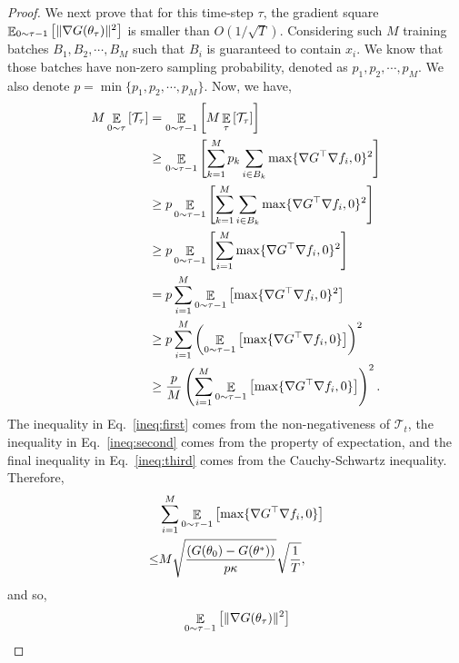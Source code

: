 \begin{proof}
We next prove that for this time-step $\tau$, the gradient square $\EEsub{\lVert \nabla G(\theta_{\tau})
\rVert^2}{0 \sim \tau-1}$ is smaller than $O(1/\sqrt{T})$. %
Considering such $M$ training batches $B_1, B_2, \cdots, B_M$ such that $B_i$ is guaranteed to contain $x_i$. We know that those batches have non-zero sampling probability, denoted as $p_1, p_2, \cdots, p_M$. We also denote $p = \min\{p_1, p_2, \cdots, p_M\}$.
Now, we have,
\begin{align}
M\EEsub{\mathcal{T}_{\tau}}{0 \sim \tau}
&= \EEsub{M\EEsub{\mathcal{T}_{\tau}}{\tau}}{0 \sim \tau-1}\\
&\geq \EEsub{\sum_{k = 1}^M p_k \sum_{i \in B_k} \max\{\nabla G^\top \nabla f_i, 0\}^2}{0 \sim \tau-1} \label{ineq:first} \\
&\geq p\EEsub{\sum_{k = 1}^M \sum_{i \in B_k} \max\{\nabla G^\top \nabla f_i, 0\}^2}{0 \sim \tau-1} \\
&\geq p\EEsub{\sum_{i=1}^M \max\{\nabla G^\top \nabla f_i, 0\}^2}{0 \sim \tau-1} \\
&= p \sum_{i=1}^M \EEsub{\max\{\nabla G^\top \nabla f_i, 0\}^2}{0 \sim \tau-1}       \\
&\geq p \sum_{i=1}^M \left (\EEsub{\max\{\nabla G^\top \nabla f_i, 0\}}{0 \sim \tau-1} \right)^2 \label{ineq:second}     \\
&\geq \frac{p}{M} \left ( \sum_{i=1}^M \EEsub{\max\{\nabla G^\top \nabla f_i, 0\}}{0 \sim \tau-1} \right)^2\label{ineq:third}.
\end{align}
The inequality in Eq.~\ref{ineq:first} comes from the non-negativeness of $\mathcal{T}_t$, the
inequality in Eq.~\ref{ineq:second} comes from the property of expectation, and the final inequality
in Eq.~\ref{ineq:third} comes from the Cauchy-Schwartz inequality. Therefore,
\begin{align}
&\sum_{i=1}^M \EEsub{\max\{\nabla G^\top \nabla f_i, 0\}}{0 \sim \tau-1} \\
\leq& M\sqrt{\frac{(G(\theta_0) - G(\theta^*))}{p \kappa}} \sqrt{\frac{1}{T}},
\end{align}
and so,
\begin{align}
\label{eq:finalequa}
&\EEsub{\lVert \nabla G(\theta_{\tau}) \rVert^2}{0 \sim \tau-1}\\

\end{align}
\end{proof}

